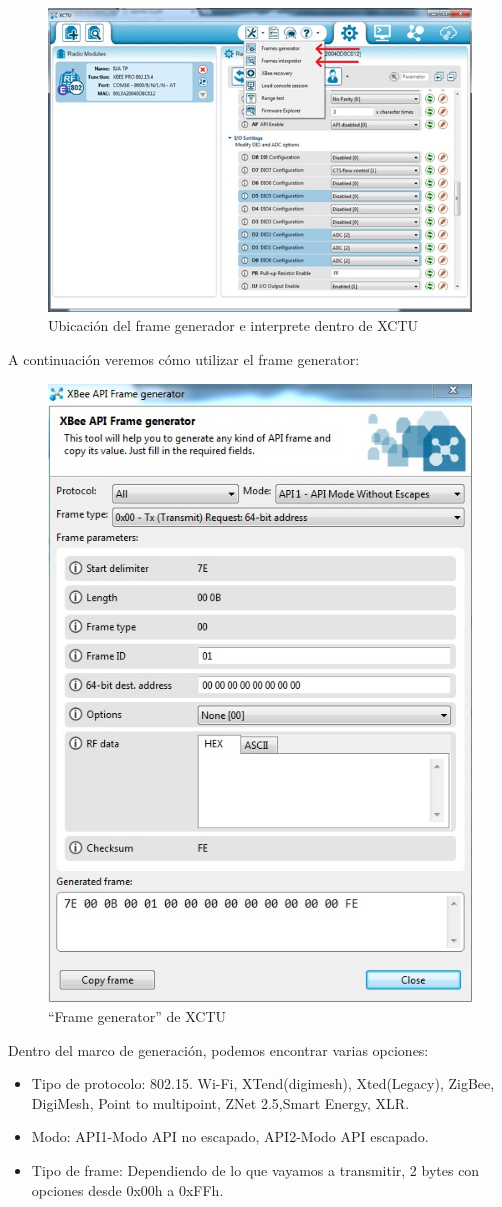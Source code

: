 \documentclass[11pt,oneside,spanish,a4paper]{article}
\begin{document}
\begin{figure}[ht]
	\centering
	\includegraphics[width=.6\textwidth]{img/IMAGEN08.jpg}
	\caption{Ubicaci\'on del frame generador e interprete dentro de XCTU}
\end{figure}
A continuación veremos cómo utilizar el frame generator:
\begin{figure}[ht]
	\centering
	\includegraphics[width=.6\textwidth]{img/IMAGEN09.jpg}
	\caption{``Frame generator'' de XCTU}
\end{figure}
Dentro del marco de generaci\'on, podemos encontrar varias opciones:
\begin{itemize}
	\item Tipo de protocolo: 802.15. Wi-Fi, XTend(digimesh), Xted(Legacy), ZigBee, DigiMesh, Point to multipoint, ZNet 2.5,Smart Energy, XLR.
	\item Modo: API1-Modo API no escapado, API2-Modo API escapado.
	\item Tipo de frame: Dependiendo de lo que vayamos a transmitir, 2 bytes con opciones desde 0x00h a 0xFFh.
	\end{itemize}
\end{document}
